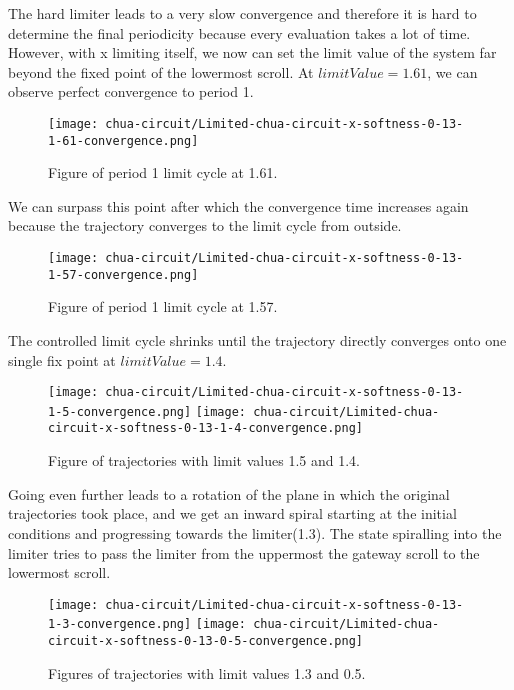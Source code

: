 \documentclass[main]{subfiles}
\begin{document}
The hard limiter leads to a very slow convergence and therefore it is hard to determine the final periodicity because every evaluation takes a lot of time. %
%
However, with x limiting itself, we now can set the limit value of the system far beyond the fixed point of the lowermost scroll. %
%
At \(limitValue=1.61\), we can observe perfect convergence to period 1.

\begin{figure}[H]
\centering
\texttt{[image: chua-circuit/Limited-chua-circuit-x-softness-0-13-1-61-convergence.png]}
\caption[Figure of period 1 limit cycle]{Figure of period 1 limit cycle at 1.61.}
\label{figure:x-0.13-fast-1-limit-cycle-trajectory-1-61}
\end{figure}

We can surpass this point after which the convergence time increases again because the trajectory converges to the limit cycle from outside.

\begin{figure}[H]
\centering
\texttt{[image: chua-circuit/Limited-chua-circuit-x-softness-0-13-1-57-convergence.png]}
\caption[Figure of period another 1 limit cycle]{Figure of period 1 limit cycle at 1.57.}
\label{figure:x-0.13-fast-1-limit-cycle-trajectory-1-57}
\end{figure}

The controlled limit cycle shrinks until the trajectory directly converges onto one single fix point at \(limitValue=1.4\). 

\begin{figure}[H]
\centering
\texttt{[image: chua-circuit/Limited-chua-circuit-x-softness-0-13-1-5-convergence.png]}
\texttt{[image: chua-circuit/Limited-chua-circuit-x-softness-0-13-1-4-convergence.png]}
\caption[Figure of fix point convergence]{Figure of trajectories with limit values 1.5 and 1.4.}
\label{figure:x-0.13-convergence-trajectories}
\end{figure}

Going even further leads to a rotation of the plane in which the original trajectories took place, and we get an inward spiral starting at the initial conditions and progressing towards the limiter(1.3). %
%
The state spiralling into the limiter tries to pass the limiter from the uppermost the gateway scroll to the lowermost scroll.

\begin{figure}[H]
\centering
\texttt{[image: chua-circuit/Limited-chua-circuit-x-softness-0-13-1-3-convergence.png]}
\texttt{[image: chua-circuit/Limited-chua-circuit-x-softness-0-13-0-5-convergence.png]}
\caption[Figure of period 1 limit cycle]{Figures of trajectories with limit values 1.3 and 0.5.}
\label{figure:x-0.13-spiral-trajectories}
\end{figure}
\end{document}
